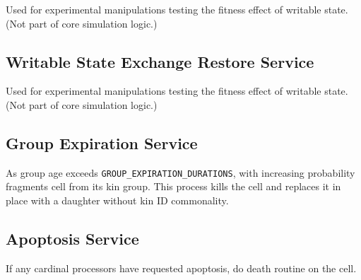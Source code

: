 
Used for experimental manipulations testing the fitness effect of writable state.
(Not part of core simulation logic.)

\subsection{Writable State Exchange Restore Service}


Used for experimental manipulations testing the fitness effect of writable state.
(Not part of core simulation logic.)

\subsection{Group Expiration Service}


As group age exceeds \texttt{GROUP\_EXPIRATION\_DURATIONS}, with increasing probability fragments cell from its kin group.
This process kills the cell and replaces it in place with a daughter without kin ID commonality.

\subsection{Apoptosis Service}


If any cardinal processors have requested apoptosis, do death routine on the cell.
